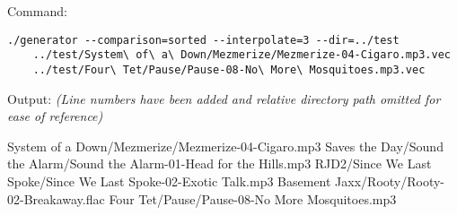Command:
\begin{verbatim}
./generator --comparison=sorted --interpolate=3 --dir=../test
    ../test/System\ of\ a\ Down/Mezmerize/Mezmerize-04-Cigaro.mp3.vec
    ../test/Four\ Tet/Pause/Pause-08-No\ More\ Mosquitoes.mp3.vec
\end{verbatim}
Output: \small \emph{(Line numbers have been added and relative directory path omitted for ease of reference)}
\begin{listing}{1}
System of a Down/Mezmerize/Mezmerize-04-Cigaro.mp3
Saves the Day/Sound the Alarm/Sound the Alarm-01-Head for the Hills.mp3
RJD2/Since We Last Spoke/Since We Last Spoke-02-Exotic Talk.mp3
Basement Jaxx/Rooty/Rooty-02-Breakaway.flac
Four Tet/Pause/Pause-08-No More Mosquitoes.mp3
\end{listing}

